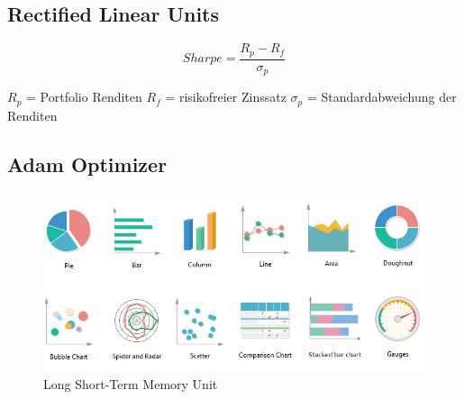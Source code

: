 \documentclass[12pt]{article}
\begin{document}
        \subsection{Rectified Linear Units}

          

            \begin{multicols}{2}
                
                \begin{Large} \[ Sharpe = \frac{R_p - R_f}{\sigma_p} \] \end{Large}

                \vfill

                \begin{small}

                    \noindent $R_p$ = Portfolio Renditen \newline 
                    $R_f$ = risikofreier Zinssatz \newline 
                    $\sigma_p$ = Standardabweichung der Renditen 

                \end{small}

            \end{multicols}

         


        \subsection{Adam Optimizer}

          

            \begin{figure}[ht]
            
                \begin{center}

                    \includegraphics[scale=0.5]{types-of-graphs.png}
                    \caption{Long Short-Term Memory Unit \cite{zhang2020}}
        
                \end{center}
                
            \end{figure}
\end{document}
